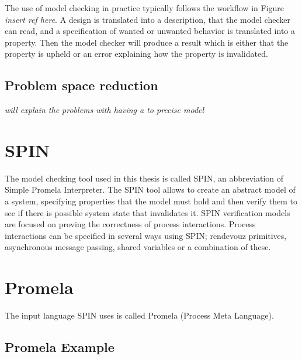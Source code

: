 
The use of model checking in practice typically follows the workflow in Figure \textit{insert ref here}. A design is translated into a description, that the model checker can read, and a specification of wanted or unwanted behavior is translated into a property. Then the model checker will produce a result which is either that the property is upheld or an error explaining how the property is invalidated. 

\subsection{Problem space reduction}

\textit{will explain the problems with having a to precise model}

\section{SPIN}

The model checking tool used in this thesis is called SPIN, an abbreviation of Simple Promela Interpreter. The SPIN tool allows to create an abstract model of a system, specifying properties that the model must hold and then verify them to see if there is possible system state that invalidates it. SPIN verification models are focused on proving the correctness of process interactions.\cite{holzmann1997model} Process interactions can be specified in several ways using SPIN; rendevouz primitives, asynchronous message passing, shared variables or a combination of these. 


\section{Promela}
The input language SPIN uses is called Promela (Process Meta Language).

\subsection{Promela Example}

